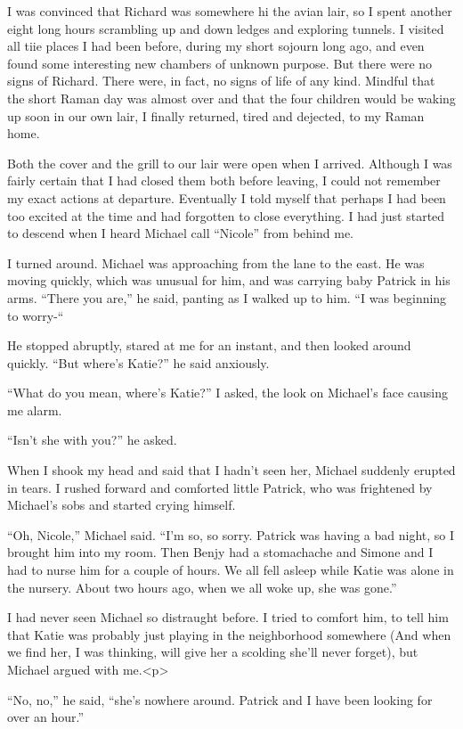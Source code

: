 \documentclass[]{article}
\begin{document}
I was convinced that Richard was somewhere hi the avian lair, so I spent another eight long hours scrambling up and down ledges and exploring tunnels. I visited all tiie places I had been before, during my short sojourn long ago, and even found some interesting new chambers of unknown purpose. But there were no signs of Richard. There were, in fact, no signs of life of any kind. Mindful that the short Raman day was almost over and that the four children would be waking up soon in our own lair, I finally returned, tired and dejected, to my Raman home.

Both the cover and the grill to our lair were open when I arrived. Although I was fairly certain that I had closed them both before leaving, I could not remember my exact actions at departure. Eventually I told myself that perhaps I had been too excited at the time and had forgotten to close everything. I had just started to descend when I heard Michael call “Nicole” from behind me.

I turned around. Michael was approaching from the lane to the east. He was moving quickly, which was unusual for him, and was carrying baby Patrick in his arms. “There you are,” he said, panting as I walked up to him. “I was beginning to worry-“

He stopped abruptly, stared at me for an instant, and then looked around quickly. “But where’s Katie?” he said anxiously.

“What do you mean, where’s Katie?” I asked, the look on Michael’s face causing me alarm.

“Isn’t she with you?” he asked.

When I shook my head and said that I hadn’t seen her, Michael suddenly erupted in tears. I rushed forward and comforted little Patrick, who was frightened by Michael’s sobs and started crying himself.

“Oh, Nicole,” Michael said. “I’m so, so sorry. Patrick was having a bad night, so I brought him into my room. Then Benjy had a stomachache and Simone and I had to nurse him for a couple of hours. We all fell asleep while Katie was alone in the nursery. About two hours ago, when we all woke up, she was gone.”

I had never seen Michael so distraught before. I tried to comfort him, to tell him that Katie was probably just playing in the neighborhood somewhere (And when we find her, I was thinking, will give her a scolding she’ll never forget), but Michael argued with me.<p>

“No, no,” he said, “she’s nowhere around. Patrick and I have been looking for over an hour.”
\end{document}

